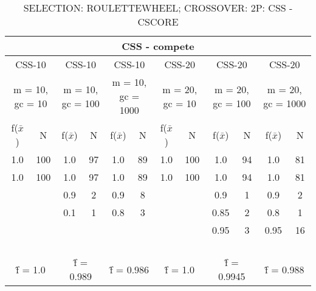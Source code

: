 
\begin{table}[H]
	\centering
	\caption{SELECTION: ROULETTEWHEEL; CROSSOVER: 2P: CSS - CSCORE}
	\begin{adjustbox}{width=1\textwidth}
		\begin{tabular}{ |c|c||c|c||c|c||c|c||c|c||c|c| }
			\hline
			\multicolumn{12}{|c|}{CSS - compete} \\
			\hline
			\multicolumn{2}{|c||}{CSS-10} & \multicolumn{2}{c||}{CSS-10} & \multicolumn{2}{c||}{CSS-10} & \multicolumn{2}{c||}{CSS-20} & \multicolumn{2}{c||}{CSS-20} & \multicolumn{2}{c|}{CSS-20}\\
			\hline
			\multicolumn{2}{|c||}{m = 10, gc = 10} & \multicolumn{2}{c||}{m = 10, gc = 100} & \multicolumn{2}{c||}{m = 10, gc = 1000} & \multicolumn{2}{c||}{m = 20, gc = 10} & \multicolumn{2}{c||}{m = 20, gc = 100} & \multicolumn{2}{c|}{m = 20, gc = 1000}\\
			\hline
			f($\bar{x}$) & N & f($\bar{x}$) & N & f($\bar{x}$) & N & f($\bar{x}$) & N & f($\bar{x}$) & N & f($\bar{x}$) & N\\
			\hline
			\hline
			1.0 & 100 & 1.0 & 97 & 1.0 & 89 & 1.0 & 100 & 1.0 & 94 & 1.0 & 81\\
			\hline
			1.0 & 100 & 1.0 & 97 & 1.0 & 89 & 1.0 & 100 & 1.0 & 94 & 1.0 & 81\\
			&   & 0.9 & 2 & 0.9 & 8 &   &   & 0.9 & 1 & 0.9 & 2\\
			&   & 0.1 & 1 & 0.8 & 3 &   &   & 0.85 & 2 & 0.8 & 1\\
			&   &   &   &   &   &   &   & 0.95 & 3 & 0.95 & 16\\
			&   &   &   &   &   &   &   &   &   &   &  \\
			&   &   &   &   &   &   &   &   &   &   &  \\
			&   &   &   &   &   &   &   &   &   &   &  \\
			&   &   &   &   &   &   &   &   &   &   &  \\
			\hline
			\multicolumn{2}{|c||}{\^{f} = 1.0} & \multicolumn{2}{c||}{\^{f} = 0.989} & \multicolumn{2}{c||}{\^{f} = 0.986} & \multicolumn{2}{c||}{\^{f} = 1.0} & \multicolumn{2}{c||}{\^{f} = 0.9945} & \multicolumn{2}{c|}{\^{f} = 0.988}\\
			\hline
		\end{tabular}
	\end{adjustbox}
\end{table}

